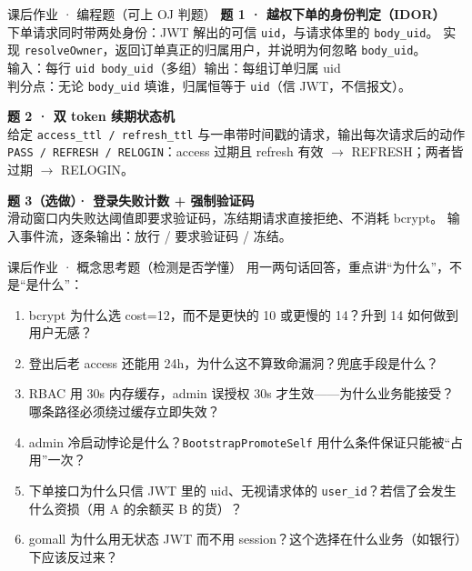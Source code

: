 \documentclass[aspectratio=169,11pt]{beamer}
\begin{document}
\begin{frame}{课后作业 · 编程题（可上 OJ 判题）}
\scriptsize
\textbf{题 1 · 越权下单的身份判定（IDOR）}\\
下单请求同时带两处身份：JWT 解出的可信 \texttt{uid}，与请求体里的 \texttt{body\_uid}。
实现 \texttt{resolveOwner}，返回订单真正的归属用户，并说明为何忽略 \texttt{body\_uid}。\\
\hspace{2mm}输入：每行 \texttt{uid body\_uid}（多组）\quad 输出：每组订单归属 uid\\
\hspace{2mm}判分点：无论 \texttt{body\_uid} 填谁，归属恒等于 \texttt{uid}（信 JWT，不信报文）。

\vspace{1mm}
\textbf{题 2 · 双 token 续期状态机}\\
给定 \texttt{access\_ttl / refresh\_ttl} 与一串带时间戳的请求，输出每次请求后的动作
\texttt{PASS / REFRESH / RELOGIN}：access 过期且 refresh 有效 $\to$ REFRESH；两者皆过期 $\to$ RELOGIN。

\vspace{1mm}
\textbf{题 3（选做）· 登录失败计数 + 强制验证码}\\
滑动窗口内失败达阈值即要求验证码，冻结期请求直接拒绝、不消耗 bcrypt。
输入事件流，逐条输出：放行 / 要求验证码 / 冻结。
\end{frame}

\begin{frame}[shrink]{课后作业 · 概念思考题（检测是否学懂）}
\scriptsize
用一两句话回答，重点讲“为什么”，不是“是什么”：
\begin{enumerate}\itemsep2pt
  \item bcrypt 为什么选 cost=12，而不是更快的 10 或更慢的 14？升到 14 如何做到用户无感？
  \item 登出后老 access 还能用 24h，为什么这不算致命漏洞？兜底手段是什么？
  \item RBAC 用 30s 内存缓存，admin 误授权 30s 才生效——为什么业务能接受？哪条路径必须绕过缓存立即失效？
  \item admin 冷启动悖论是什么？\texttt{BootstrapPromoteSelf} 用什么条件保证只能被“占用”一次？
  \item 下单接口为什么只信 JWT 里的 uid、无视请求体的 \texttt{user\_id}？若信了会发生什么资损（用 A 的余额买 B 的货）？
  \item gomall 为什么用无状态 JWT 而不用 session？这个选择在什么业务（如银行）下应该反过来？
\end{enumerate}
\end{frame}
\end{document}
